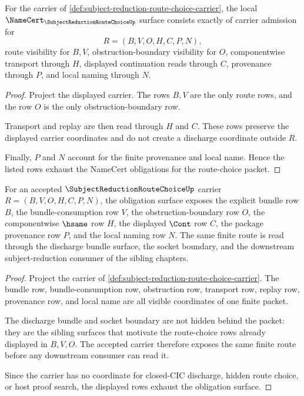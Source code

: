 \begin{theorem}
\label{thm:subject-reduction-route-choice-obligations}
For the carrier of \autoref{def:subject-reduction-route-choice-carrier}, the local $\NameCert_{\SubjectReductionRouteChoiceUp}$ surface consists exactly of carrier admission for
$$
R=(B,V,O,H,C,P,N),
$$
route visibility for $B,V$, obstruction-boundary visibility for $O$, componentwise transport through $H$, displayed continuation reads through $C$, provenance through $P$, and local naming through $N$.
\end{theorem}
\begin{proof}
Project the displayed carrier. The rows $B,V$ are the only route rows, and the row $O$ is the only obstruction-boundary row.

Transport and replay are then read through $H$ and $C$. These rows preserve the displayed carrier coordinates and do not create a discharge coordinate outside $R$.

Finally, $P$ and $N$ account for the finite provenance and local name. Hence the listed rows exhaust the NameCert obligations for the route-choice packet.
\end{proof}

\begin{theorem}
\label{thm:subject-reduction-route-choice-obligation-surface}
For an accepted $\SubjectReductionRouteChoiceUp$ carrier $R=(B,V,O,H,C,P,N)$, the obligation surface exposes the explicit bundle row $B$, the bundle-consumption row $V$, the obstruction-boundary row $O$, the componentwise $\hsame$ row $H$, the displayed $\Cont$ row $C$, the package provenance row $P$, and the local naming row $N$. The same finite route is read through the discharge bundle surface, the socket boundary, and the downstream subject-reduction consumer of the sibling chapters.
\end{theorem}
\begin{proof}
Project the carrier of \autoref{def:subject-reduction-route-choice-carrier}. The bundle row, bundle-consumption row, obstruction row, transport row, replay row, provenance row, and local name are all visible coordinates of one finite packet.

The discharge bundle and socket boundary are not hidden behind the packet: they are the sibling surfaces that motivate the route-choice rows already displayed in $B,V,O$. The accepted carrier therefore exposes the same finite route before any downstream consumer can read it.

Since the carrier has no coordinate for closed-CIC discharge, hidden route choice, or host proof search, the displayed rows exhaust the obligation surface.
\end{proof}

